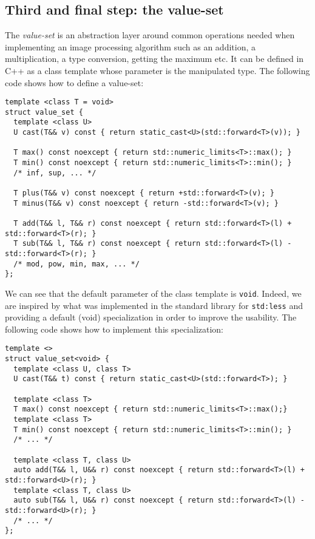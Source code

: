 \subsection{Third and final step: the value-set}

The \emph{value-set} is an abstraction layer around common operations needed when implementing an image processing
algorithm such as an addition, a multiplication, a type conversion, getting the maximum etc. It can be defined in C++ as
a class template whose parameter is the manipulated type. The following code shows how to define a value-set:

\begin{verbatim}
template <class T = void>
struct value_set {
  template <class U>
  U cast(T&& v) const { return static_cast<U>(std::forward<T>(v)); }

  T max() const noexcept { return std::numeric_limits<T>::max(); }
  T min() const noexcept { return std::numeric_limits<T>::min(); }
  /* inf, sup, ... */

  T plus(T&& v) const noexcept { return +std::forward<T>(v); }
  T minus(T&& v) const noexcept { return -std::forward<T>(v); }

  T add(T&& l, T&& r) const noexcept { return std::forward<T>(l) + std::forward<T>(r); }
  T sub(T&& l, T&& r) const noexcept { return std::forward<T>(l) - std::forward<T>(r); }
  /* mod, pow, min, max, ... */
};
\end{verbatim}

We can see that the default parameter of the class template is \texttt{void}. Indeed, we are inspired by what was
implemented in the standard library for \texttt{std:less} and providing a default (void) specialization in order to
improve the usability. The following code shows how to implement this specialization:

\begin{verbatim}
template <>
struct value_set<void> {
  template <class U, class T>
  U cast(T&& t) const { return static_cast<U>(std::forward<T>); }

  template <class T>
  T max() const noexcept { return std::numeric_limits<T>::max();}
  template <class T>
  T min() const noexcept { return std::numeric_limits<T>::min(); }
  /* ... */

  template <class T, class U>
  auto add(T&& l, U&& r) const noexcept { return std::forward<T>(l) + std::forward<U>(r); }
  template <class T, class U>
  auto sub(T&& l, U&& r) const noexcept { return std::forward<T>(l) - std::forward<U>(r); }
  /* ... */
};
\end{verbatim}

